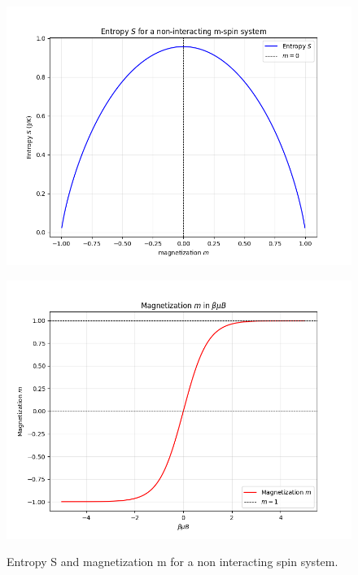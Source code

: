 \documentclass{article}
\begin{document}
\begin{figure}[h!]
    \centering
    \begin{minipage}{0.45\textwidth}
        \centering
        \includegraphics[width=\textwidth]{images/statistical-physics/s-mc-spin-system.png}
        \label{fig:image1}
    \end{minipage}
    \hfill
    \begin{minipage}{0.45\textwidth}
        \centering
        \includegraphics[width=\textwidth]{images/statistical-physics/m-mc-spin-system.png}
        \label{fig:image2}
    \end{minipage}
    \caption{
        Entropy S and magnetization m for a non interacting spin system.
    }
    \label{fig:spin-system}
\end{figure}
\end{document}

